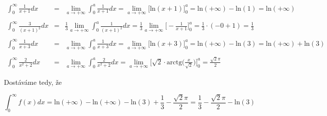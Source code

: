 \begin{eqnarray}
\int_{0}^{\infty} \frac{1}{x+1} dx \quad & = & \lim_{a \rightarrow +\infty}\int_{0}^{a} \frac{1}{x+1} dx =  \lim_{a \rightarrow +\infty}\big[\mbox{ln}(x + 1)\big]_0^a = \mbox{ln}(+\infty) - \mbox{ln}(1) = \mbox{ln}(+\infty)\nonumber \\ \quad \nonumber\\
\int_{0}^{\infty} \frac{3}{(x+1)^2} dx & =  &\frac{1}{3} \lim_{a \rightarrow +\infty}\int_{0}^{a} \frac{1}{(x + 1)^2} dx = \frac{1}{3} \lim_{a \rightarrow +\infty} \Big[ -\frac{1}{x+1}\Big]^a_0 = \frac{1}{3}\cdot(-0 + 1) = \frac{1}{3} \nonumber \\ \quad \nonumber\\
\int_{0}^{\infty} \frac{1}{x+3} dx \quad \, &  = &  \lim_{a \rightarrow +\infty}\int_{0}^{a} \frac{1}{x+3}dx = \lim_{a \rightarrow +\infty}\big[\mbox{ln}(x + 3)\big]_0^a = \mbox{ln}(+\infty) - \mbox{ln}(3) = \mbox{ln}(+\infty) + \mbox{ln}(3)\nonumber \\ \quad \nonumber\\
\int_{0}^{\infty} \frac{2}{x^2+2} dx \quad & =  &\lim_{a \rightarrow +\infty}\int_{0}^{a} \frac{2}{x^2+2} dx =  \lim_{a \rightarrow +\infty} \Big[ \sqrt{2}\cdot\mbox{arctg}\Big(\frac{x}{\sqrt{2}}\Big)\Big]^a_0 = \frac{\sqrt{2}\pi}{2}\nonumber \quad \nonumber
\end{eqnarray}

\noindent Dostáváme tedy, že

\begin{displaymath}
\int_{0}^{\infty} f(x)dx = \mbox{ln}(+\infty) - \mbox{ln}(+\infty) - \mbox{ln}(3) + \frac{1}{3} - \frac{\sqrt{2}\pi}{2} = \frac{1}{3} - \frac{\sqrt{2}\pi}{2} - \mbox{ln}(3)
\end{displaymath}





